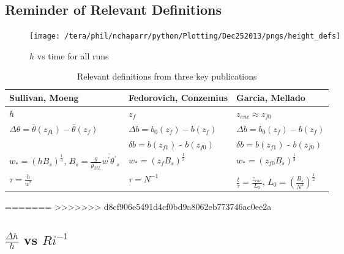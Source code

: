 \subsection{Reminder of Relevant Definitions}
\FloatBarrier
\begin{figure}[htbp]
    \centering
    \texttt{[image: /tera/phil/nchaparr/python/Plotting/Dec252013/pngs/height\_defs]}
    \caption{$h$ vs time for all runs}
    \label{fig:hvstime}   %
\end{figure}

\begin{table}[!ht]
    \begin{center}
    \begin{tabular}{ | p{3cm} | p{3cm} | p{3cm} |}
    \hline
     Sullivan, Moeng & Fedorovich, Conzemius &  Garcia, Mellado\\ \hline
     $h$ & $z_{f}$& $z_{enc} \approx z_{f0}$ \\ \hline
     $\Delta \theta = \overline{\theta}(z_{f1})-\overline{\theta}(z_{f})$ & $\Delta b = b_{0}(z_{f}) -b(z_{f})$ & $\Delta b = b_{0}(z_{f}) - b(z_{f}) $\\ \hline
      & $\delta b = b(z_{f1})$ - $b(z_{f0})$ & $\delta b = b(z_{f1})$ - $b(z_{f0})$\\ \hline
      $w_{*}= (h B_{s})^{\frac{1}{3}}$, $B_{s} = \frac{g}{\overline{\theta_{ML}}}\overline{w^{'}\theta^{'}}_{s}$ & $w_{*}= (z_{f} B_{s})^{\frac{1}{3}}$ & $w_{*}= (z_{f0} B_{s})^{\frac{1}{3}}$\\ \hline
      $\tau = \frac{h}{w^{*}}$ & $\tau=N^{-1}$ & $\frac{t}{\tau}=\frac{z_{enc}}{L_{0}}$, $L_{0}=\left(\frac{B_{s}}{N^{3}}\right)^{\frac{1}{2}}$\\ \hline
 
   
\end{tabular}
\caption{Relevant definitions from three key publications}
\label{fig:}   
\end{center}    
\end{table}
=======
>>>>>>> d8cf906e5491d4cf0bd9a8062eb773746ac0ee2a

\subsection{$\frac{\Delta h}{h}$ vs $Ri^{-1}$}
\label{subsec:deltahri}
\FloatBarrier

